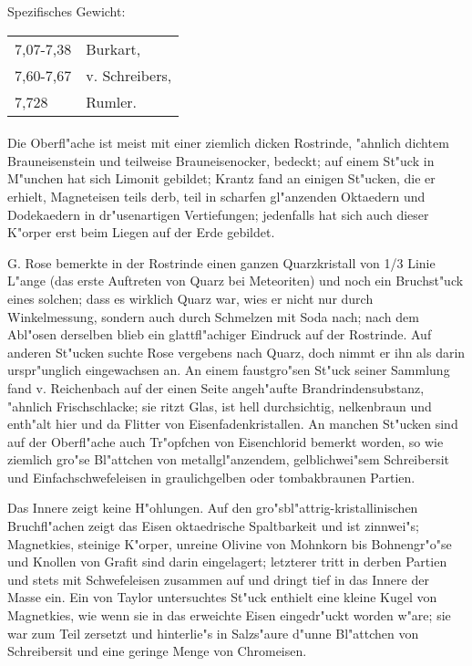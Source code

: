 \documentclass[a4paper, 11pt, oneside]{article}
\begin{document}
Spezifisches Gewicht:  
\begin{table}[!ht]
    \centering
    \begin{tabular}{l l}
        7,07-7,38 & Burkart,\\
        7,60-7,67 & v. Schreibers,\\
        7,728 & Rumler.
    \end{tabular}
\end{table}
\paragraph{}
Die Oberfl"ache ist meist mit einer ziemlich dicken Rostrinde, "ahnlich dichtem Brauneisenstein und teilweise Brauneisenocker, bedeckt; auf einem St"uck in M"unchen hat sich Limonit gebildet; Krantz fand an einigen St"ucken, die er erhielt, Magneteisen teils derb, teil in scharfen gl"anzenden Oktaedern und Dodekaedern in dr"usenartigen Vertiefungen; jedenfalls hat sich auch dieser K"orper erst beim Liegen auf der Erde gebildet.

G. Rose bemerkte in der Rostrinde einen ganzen Quarzkristall von 1/3 Linie L"ange (das erste Auftreten von Quarz bei Meteoriten) und noch ein Bruchst"uck eines solchen; dass es wirklich Quarz war, wies er nicht nur durch Winkelmessung, sondern auch durch Schmelzen mit Soda nach; nach dem Abl"osen derselben blieb ein glattfl"achiger Eindruck auf der Rostrinde. Auf anderen St"ucken suchte Rose vergebens nach Quarz, doch nimmt er ihn als darin urspr"unglich eingewachsen an. An einem faustgro"sen St"uck seiner Sammlung fand v. Reichenbach auf der einen Seite angeh"aufte Brandrindensubstanz, "ahnlich Frischschlacke; sie ritzt Glas, ist hell durchsichtig, nelkenbraun und enth"alt hier und da Flitter von Eisenfadenkristallen. An manchen St"ucken sind auf der Oberfl"ache auch Tr"opfchen von Eisenchlorid bemerkt worden, so wie ziemlich gro"se Bl"attchen von metallgl"anzendem, gelblichwei"sem Schreibersit und Einfachschwefeleisen in graulichgelben oder tombakbraunen Partien.

Das Innere zeigt keine H"ohlungen. Auf den gro"sbl"attrig-kristallinischen Bruchfl"achen zeigt das Eisen oktaedrische Spaltbarkeit und ist zinnwei"s; Magnetkies, steinige K"orper, unreine Olivine von Mohnkorn bis Bohnengr"o"se und Knollen von Grafit sind darin eingelagert; letzterer tritt in derben Partien und stets mit Schwefeleisen zusammen auf und dringt tief in das Innere der Masse ein. Ein von Taylor untersuchtes St"uck enthielt eine kleine Kugel von Magnetkies, wie wenn sie in das erweichte Eisen eingedr"uckt worden w"are; sie war zum Teil zersetzt und hinterlie"s in Salzs"aure d"unne Bl"attchen von Schreibersit und eine geringe Menge von Chromeisen.
\end{document}
